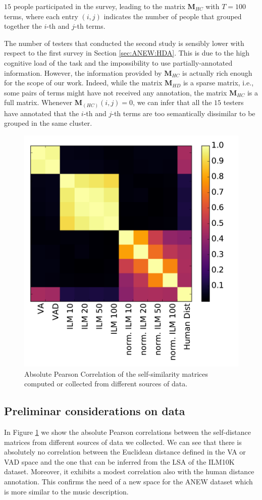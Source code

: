 $15$ people participated in the survey, leading to the matrix $\mathbf{M}_{HC} $ with $T=100$ terms, where each entry $(i,j)$ indicates the number of people that grouped together the $i$-th and $j$-th terms. 

The number of testers that conducted the second study is sensibly lower with respect to the first survey in Section \ref{sec:ANEW:HDA}. This is due to the high cognitive load of the task and the impossibility to use partially-annotated information. However, the information provided by $\mathbf{M}_{HC}$ is actually rich enough for the scope of our work. Indeed, while the matrix $ \mathbf{M}_{HD}$ is a sparse matrix, i.e., some pairs of terms might have not received any annotation, the matrix $\mathbf{M}_{HC} $ is a full matrix. Whenever $\mathbf{M}_{(HC)}(i,j)=0$, we can infer that all the $15$ testers have annotated that the $i$-th and $j$-th terms are too semantically dissimilar to be grouped in the same cluster. 

\begin{figure}[bt] 
	\centering 
	\includegraphics[width=0.80\columnwidth]{img/ANEW/pearson_dist_3.pdf}
	\caption{Absolute Pearson Correlation of the self-similarity matrices computed or collected from different sources of data.}
	\label{fig:ANEWdistData}
\end{figure}	

\subsection{Preliminar considerations on data}
In Figure \ref{fig:ANEWdistData} we show the absolute Pearson correlations between the self-distance matrices from different sources of data we collected. We can see that there is absolutely no correlation between the Euclidean distance defined in the VA or VAD space and the one that can be inferred from the LSA of the ILM10K dataset. Moreover, it exhibits a modest correlation also with the human distance annotation. This confirms the need of a new space for the ANEW dataset which is more similar to the music description.

